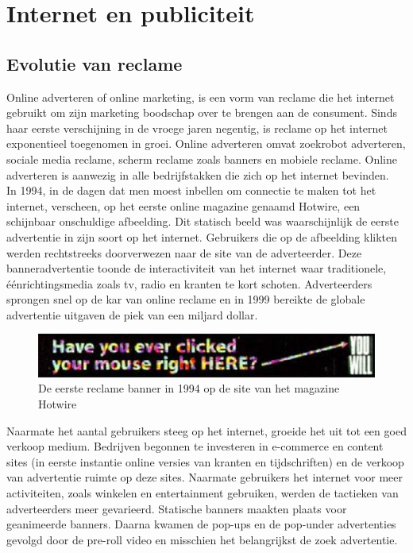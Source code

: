 \documentclass[pdftex,a4paper,12pt,twoside]{report}
\begin{document}
\chapter{Internet en publiciteit}
\label{ch:Internet en publiciteit}

\section{Evolutie van reclame}
\label{sec:Evolutie van reclame}
Online adverteren of online marketing, is een vorm van reclame die het internet gebruikt om zijn marketing boodschap over te brengen aan de consument. Sinds haar eerste verschijning in de vroege jaren negentig, is reclame op het internet exponentieel toegenomen in groei. Online adverteren omvat zoekrobot adverteren, sociale media reclame, scherm reclame zoals banners en mobiele reclame. Online adverteren is aanwezig in alle bedrijfstakken die zich op het internet bevinden.
\\
In 1994, in de dagen dat men moest inbellen om connectie te maken tot het internet, verscheen, op het eerste online magazine genaamd Hotwire, een schijnbaar onschuldige afbeelding. Dit statisch beeld was waarschijnlijk de eerste advertentie in zijn soort op het internet. Gebruikers die op de afbeelding klikten werden rechtstreeks doorverwezen naar de site van de adverteerder. Deze banneradvertentie toonde de interactiviteit van het internet waar traditionele, éénrichtingsmedia zoals tv, radio en kranten te kort schoten. Adverteerders sprongen snel op de kar van online reclame en in 1999 bereikte de globale advertentie uitgaven de piek van een miljard dollar.
\begin{figure}[h!]
\centering
\includegraphics[width=12cm]{img/firstbanner}
\caption{De eerste reclame banner in 1994 op de site van het magazine Hotwire}
\label{fig: Banner-Ads}
\end{figure}
Naarmate het aantal gebruikers steeg op het internet, groeide het uit tot een goed verkoop medium. Bedrijven begonnen te investeren in e-commerce en content sites (in eerste instantie online versies van kranten en tijdschriften) en de verkoop van advertentie ruimte op deze sites. Naarmate gebruikers het internet voor meer activiteiten, zoals winkelen en entertainment gebruiken, werden de tactieken van adverteerders meer gevarieerd. Statische banners maakten plaats voor geanimeerde banners. Daarna kwamen de pop-ups en de pop-under advertenties gevolgd door de pre-roll video en misschien het belangrijkst de zoek advertentie. 
\end{document}
